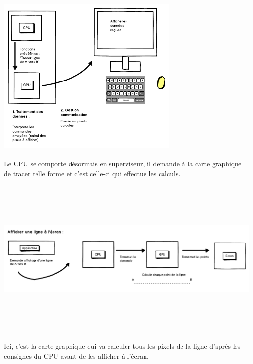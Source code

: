 \begin{center}
\includegraphics[width=9cm,height=8cm]{img/gpuRaster.png}

Le CPU se comporte désormais en superviseur, il demande à la carte graphique de tracer telle forme et c'est celle-ci qui effectue les calculs.


\includegraphics[width=15cm,height=8cm]{img/gpuRasterExemple.png}

Ici, c'est la carte graphique qui va calculer tous les pixels de la ligne d'après les consignes du CPU avant de les afficher à l'écran.

\end{center}
\newpage

